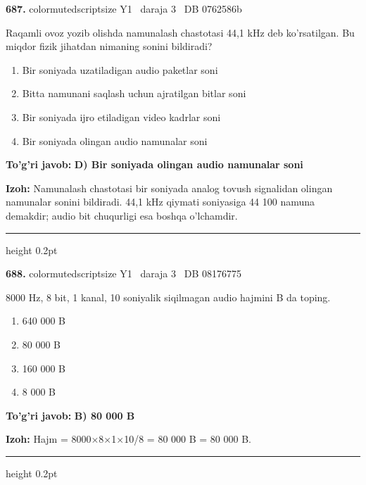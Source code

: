 \documentclass[10pt,a4paper,oneside]{article}
\begin{document}
\noindent\textbf{\color{ink}687.}  {color{muted}scriptsize Y1 \textbullet\ daraja 3 \textbullet\ DB 0762586b}
\par
Raqamli ovoz yozib olishda namunalash chastotasi 44,1 kHz deb ko'rsatilgan. Bu miqdor fizik jihatdan nimaning sonini bildiradi?
\begin{enumerate}[label=\Alph*),leftmargin=9mm]
\item Bir soniyada uzatiladigan audio paketlar soni
\item Bitta namunani saqlash uchun ajratilgan bitlar soni
\item Bir soniyada ijro etiladigan video kadrlar soni
\item Bir soniyada olingan audio namunalar soni
\end{enumerate}
\begin{tcolorbox}[enhanced,breakable,colback=teal!4,colframe=teal!50!black,boxrule=0.5pt,arc=1.1mm,left=3mm,right=3mm,top=1.7mm,bottom=1.7mm,before skip=2mm,after skip=2mm]
\textbf{\color{teal}To'g'ri javob:} \textbf{D) Bir soniyada olingan audio namunalar soni}
\par\smallskip
\textbf{Izoh:} Namunalash chastotasi bir soniyada analog tovush signalidan olingan namunalar sonini bildiradi. 44,1 kHz qiymati soniyasiga 44 100 namuna demakdir; audio bit chuqurligi esa boshqa o'lchamdir.
\end{tcolorbox}
\vspace{2mm}\hrule height 0.2pt \vspace{3mm}

\noindent\textbf{\color{ink}688.}  {color{muted}scriptsize Y1 \textbullet\ daraja 3 \textbullet\ DB 08176775}
\par
8000 Hz, 8 bit, 1 kanal, 10 soniyalik siqilmagan audio hajmini B da toping.
\begin{enumerate}[label=\Alph*),leftmargin=9mm]
\item 640 000 B
\item 80 000 B
\item 160 000 B
\item 8 000 B
\end{enumerate}
\begin{tcolorbox}[enhanced,breakable,colback=teal!4,colframe=teal!50!black,boxrule=0.5pt,arc=1.1mm,left=3mm,right=3mm,top=1.7mm,bottom=1.7mm,before skip=2mm,after skip=2mm]
\textbf{\color{teal}To'g'ri javob:} \textbf{B) 80 000 B}
\par\smallskip
\textbf{Izoh:} Hajm = 8000\ensuremath{\times}8\ensuremath{\times}1\ensuremath{\times}10/8 = 80 000 B = 80 000 B.
\end{tcolorbox}
\vspace{2mm}\hrule height 0.2pt \vspace{3mm}
\end{document}
